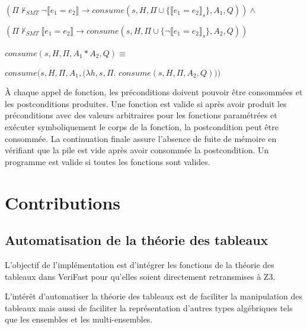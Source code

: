 \documentclass[11pt,openany]{article}
\newcommand{\verifast}{VeriFast}
\begin{document}
		$(\Pi\not\vdash_{SMT}\neg\llbracket e_1 = e_2\rrbracket\rightarrow consume(s,H,\Pi\cup\{\llbracket e_1 = e_2\rrbracket_s\},A_1,Q))\land$
		
		$(\Pi\not\vdash_{SMT}\llbracket e_1 = e_2\rrbracket\rightarrow consume(s,H,\Pi\cup\{\neg\llbracket e_1 = e_2\rrbracket_s\},A_2,Q))$\\ \\
		$consume(s,H,\Pi,A_1*A_2,Q)\equiv$
		
		$consume(s,H,\Pi,A_1,(\lambda h,s,\Pi.$ $consume(s,H,\Pi,A_2,Q)))$

	\`A chaque appel de fonction, les pr\'econditions doivent pouvoir \^etre consomm\'ees et les postconditions produites. Une fonction est valide si apr\`es avoir produit les pr\'econditions avec des valeurs arbitraires pour les fonctions param\'etr\'ees et ex\'ecuter symboliquement le corps de la fonction, la postcondition peut \^etre consomm\'ee. La continuation finale assure l'absence de fuite de m\'emoire en v\'erifiant que la pile est vide apr\`es avoir consomm\'ee la postcondition. Un programme est valide si toutes les fonctions sont valides.
	
\section{Contributions}
	\subsection{Automatisation de la th\'eorie des tableaux}
	L'objectif de l'impl\'ementation est d'int\'egrer les fonctions de la th\'eorie des tableaux dans \verifast{} pour qu'elles soient directement retransmises \`a Z3.
	
	L'int\'er\^et d'automatiser la th\'eorie des tableaux est de faciliter la manipulation des tableaux mais aussi de faciliter la repr\'esentation d'autres types alg\'ebriques tels que les ensembles et les multi-ensembles.
	
\end{document}
